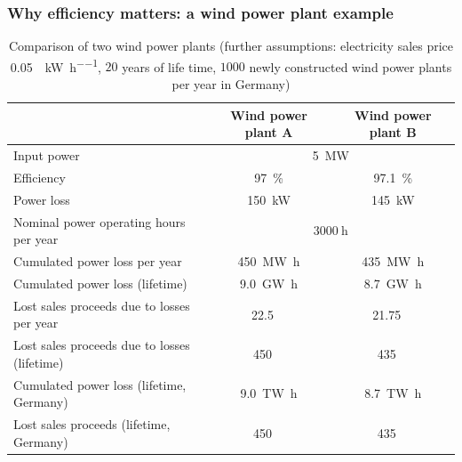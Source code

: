 \begin{frame}[c]
	\frametitle{Why efficiency matters: a wind power plant example}
	\begin{table}
		\centering
		\begin{tabular}{lcc}
			\toprule
			& Wind power plant A & Wind power plant B \\
			\midrule
			Input power & \multicolumn{2}{c}{\SI{5}{\mega\watt}} \\
			Efficiency & \SI{97}{\percent} & \SI{97.1}{\percent}  \\
			Power loss & \SI{150}{\kilo\watt} & \SI{145}{\kilo\watt}\\
			\midrule
			Nominal power operating hours per year & \multicolumn{2}{c}{$\SI{3000}{\hour}$} \\
			Cumulated power loss per year & \SI{450}{\mega\watt\hour} & \SI{435}{\mega\watt\hour} \\
			Cumulated power loss (lifetime) & \SI{9.0}{\giga\watt\hour} & \SI{8.7}{\giga\watt\hour} \\
			\midrule
			Lost sales proceeds due to losses per year  & \SI{22.5}{\kilo\EUR} & \SI{21.75}{\kilo\EUR} \\
			Lost sales proceeds due to losses (lifetime)  & \SI{450}{\kilo\EUR} & \SI{435}{\kilo\EUR} \\
			\midrule
			Cumulated power loss (lifetime, Germany)  & \SI{9.0}{\tera\watt\hour} & \SI{8.7}{\tera\watt\hour} \\
			Lost sales proceeds (lifetime, Germany)  & \SI{450}{\mega\EUR} & \SI{435}{\mega\EUR} \\
			\bottomrule
		\end{tabular}
		\label{tab:efficiency_wind_power_example}
		\caption{Comparison of two wind power plants (further assumptions:  electricity sales price \SI[fraction-function=\nicefrac]{0.05}{\EUR\per\kilo\watt\per\hour}, $20$ years of life time, $\num{1000}$ newly constructed wind power plants per year in Germany)}
	\end{table}
\end{frame}


